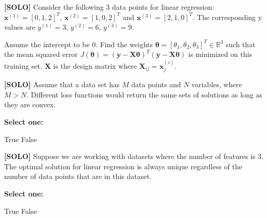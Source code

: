 \documentclass[11pt,addpoints,answers]{exam}
\newcommand{\xv}{\mathbf{x}}
\newcommand{\yv}{\mathbf{y}}
\newcommand{\Xv}{\mathbf{X}}
\newcommand{\thetav     }{\boldsymbol \theta     }
\begin{document}
\begin{questions}
\begin{parts}
    \end{parts}
    
    \clearpage
    
    \question[3] \textbf{[SOLO]} Consider the following 3 data points for linear regression: $\xv^{(1)} = [0, 1, 2]^T$, $\xv^{(2)} = [1, 0, 2]^T$ and $\xv^{(3)} = [2, 1, 0]^T$. The corresponding y values are $y^{(1)}=3$, $y^{(2)}=6$, $y^{(3)}=9$.
    
    Assume the intercept to be 0. Find the weights $\thetav = [\theta_1,  \theta_2,  \theta_3]^T \in \mathbb{R}^3$ such that the mean squared error $J(\thetav) = (\mathbf{\yv} - \Xv \thetav)^T(\mathbf{\yv} - \Xv \thetav)$ is minimized on this training set. $\Xv$ is the design matrix where $\Xv_{ij} = \xv_j^{(i)}$. 
    
    \begin{your_solution}[title=$\theta_1$:,height=2cm,width=5cm]
    \end{your_solution}
    \begin{your_solution}[title=$\theta_2$:,height=2cm,width=5cm]
    \end{your_solution}
    \begin{your_solution}[title=$\theta_3$:,height=2cm,width=5cm]
    \end{your_solution}
    
    
    

    \question[1] \textbf{[SOLO]} Assume that a data set has $M$ data points and $N$ variables, where $M>N$. Different loss functions would return the same sets of solutions as long as they are convex.
    
    \textbf{Select one:}
    \begin{checkboxes}
        \choice True
        \choice False
    \end{checkboxes}
    
    
    
\question[1] \textbf{[SOLO]} Suppose we are working with datasets where the number of features is 3. The optimal solution for linear regression is always unique regardless of the number of data points that are in this dataset.
    
    \textbf{Select one:}
    \begin{checkboxes}
        \choice True
        \choice False
    \end{checkboxes}
    

\end{questions}
\end{document}
